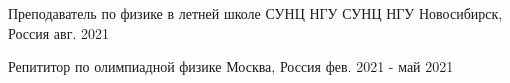 

\begin{cventries}



  \cventry
  {Преподаватель по физике в летней школе СУНЦ НГУ}
  {СУНЦ НГУ}
  {Новосибирск, Россия}
  {авг. 2021}
  {}

  \cventry
  {Репититор по олимпиадной физике} %
  {} %
  {Москва, Россия} %
  {фев. 2021 - май 2021} %
  {}



\end{cventries}
